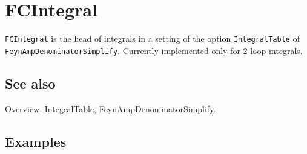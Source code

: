 \documentclass[../FeynCalcManual.tex]{subfiles}
\begin{document}
\hypertarget{fcintegral}{%
\section{FCIntegral}\label{fcintegral}}

\texttt{FCIntegral} is the head of integrals in a setting of the option
\texttt{IntegralTable} of \texttt{FeynAmpDenominatorSimplify}. Currently
implemented only for 2-loop integrals.

\subsection{See also}

\hyperlink{toc}{Overview}, \hyperlink{integraltable}{IntegralTable},
\hyperlink{feynampdenominatorsimplify}{FeynAmpDenominatorSimplify}.

\subsection{Examples}
\end{document}
